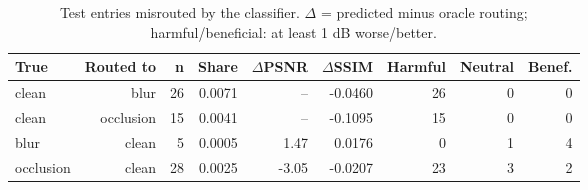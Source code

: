 \begin{table}[t]
\centering
\caption{Test entries misrouted by the classifier. $\Delta$ = predicted minus oracle routing; harmful/beneficial: at least 1 dB worse/better.}
\label{tab:t2_misrouting}
\begin{tabular}{lrrrrrrrr}
\toprule
True & Routed to & n & Share & $\Delta$PSNR & $\Delta$SSIM & Harmful & Neutral & Benef. \\
\midrule
clean & blur & 26 & 0.0071 & -- & -0.0460 & 26 & 0 & 0 \\
clean & occlusion & 15 & 0.0041 & -- & -0.1095 & 15 & 0 & 0 \\
blur & clean & 5 & 0.0005 & 1.47 & 0.0176 & 0 & 1 & 4 \\
occlusion & clean & 28 & 0.0025 & -3.05 & -0.0207 & 23 & 3 & 2 \\
\bottomrule
\end{tabular}
\end{table}
